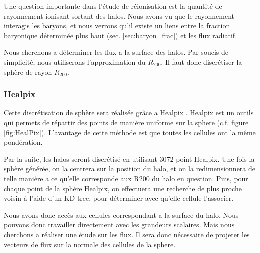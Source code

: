 

Une question importante dans l’étude de réionisation est la quantité de rayonnement ionisant sortant des halos.
Nous avons vu que le rayonnement interagis les baryons, et nous verrons qu'il existe un liens entre la fraction baryonique déterminée plus haut (sec. \ref{sec:baryon_frac}) et les flux radiatif.

Nous cherchons a déterminer les flux a la surface des halos.
Par soucis de simplicité, nous utiliserons l'approximation du $R_{200}$.
Il faut donc discrétiser la sphère de rayon $R_{200}$.


\subsubsection{Healpix}
\label{sec:healpix}

Cette discrétisation de sphère sera réalisée grâce a Healpix \citep{gorski_healpix:_2005}.
Healpix est un outils qui permets de répartir des points de manière uniforme sur la sphere (c.f. figure \ref{fig:HealPix}).
L'avantage de cette méthode est que toutes les cellules ont la même pondération.

Par la suite, les halos seront discrétisé en utilisant $3072$ point Healpix.
Une fois la sphère générée, on la centrera sur la position du halo, et on la redimensionnera de telle manière a ce qu'elle corresponde aux R200 du halo en question.
Puis, pour chaque point de la sphère Healpix, on effectuera une recherche de plus proche voisin à l'aide d'un KD tree, pour déterminer avec qu'elle cellule l'associer.


Nous avons donc accès aux cellules correspondant a la surface du halo.
Nous pouvons donc travailler directement avec les grandeurs scalaires.
Mais nous cherchons a réaliser une étude sur les flux.
Il sera donc nécessaire de projeter les vecteurs de flux sur la normale des cellules de la sphere.




